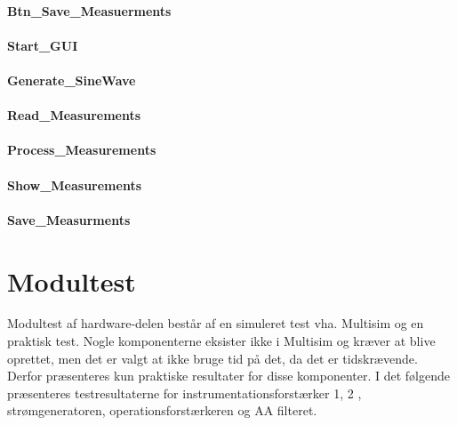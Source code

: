\subsubsection{Btn\_Save\_Measuerments}



\subsubsection{Start\_GUI} 




\subsubsection{Generate\_SineWave} 





\subsubsection{Read\_Measurements}


\subsubsection{Process\_Measurements} 





\subsubsection{Show\_Measurements} 


\subsubsection{Save\_Measurments} 




\chapter{Modultest}
Modultest af hardware-delen består af en simuleret test vha. Multisim og en praktisk test. Nogle komponenterne eksister ikke i Multisim og kræver at blive oprettet, men det er valgt at ikke bruge tid på det, da det er tidskrævende. Derfor præsenteres kun praktiske resultater for disse komponenter. I det følgende præsenteres testresultaterne for instrumentationsforstærker 1, 2 , strømgeneratoren, operationsforstærkeren og AA filteret. 

